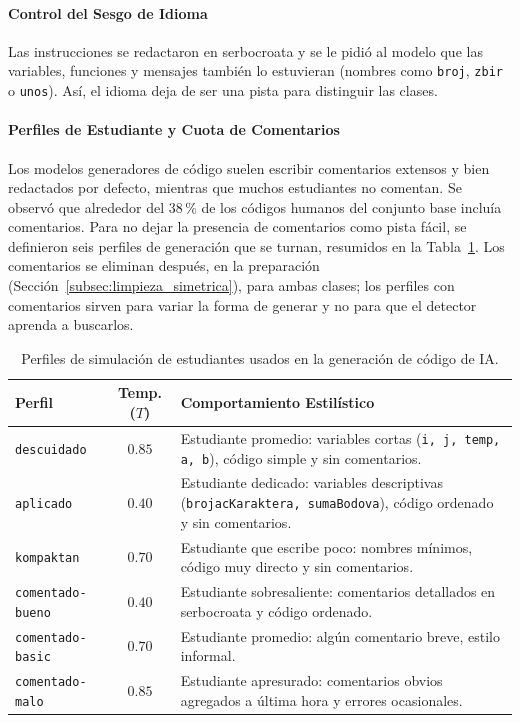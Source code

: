 \paragraph{Control del Sesgo de Idioma}
Las instrucciones se redactaron en serbocroata y se le pidió al modelo que las variables, funciones y mensajes también lo estuvieran (nombres como \texttt{broj}, \texttt{zbir} o \texttt{unos}). Así, el idioma deja de ser una pista para distinguir las clases.

\paragraph{Perfiles de Estudiante y Cuota de Comentarios}
Los modelos generadores de código suelen escribir comentarios extensos y bien redactados por defecto, mientras que muchos estudiantes no comentan. Se observó que alrededor del 38\,\% de los códigos humanos del conjunto base incluía comentarios. %
Para no dejar la presencia de comentarios como pista fácil, se definieron seis perfiles de generación que se turnan, resumidos en la Tabla~\ref{tab:perfiles_generacion}. Los comentarios se eliminan después, en la preparación (Sección~\ref{subsec:limpieza_simetrica}), para ambas clases; los perfiles con comentarios sirven para variar la forma de generar y no para que el detector aprenda a buscarlos.

\begin{table}[H]
    \centering
    \caption{Perfiles de simulación de estudiantes usados en la generación de código de IA.}
    \label{tab:perfiles_generacion}
    \begin{tabularx}{\textwidth}{|l|c|X|}
        \hline
        \textbf{Perfil} & \textbf{Temp. ($T$)} & \textbf{Comportamiento Estilístico} \\ \hline
        \texttt{descuidado} & $0.85$ & Estudiante promedio: variables cortas (\texttt{i, j, temp, a, b}), código simple y sin comentarios. \\ \hline
        \texttt{aplicado} & $0.40$ & Estudiante dedicado: variables descriptivas (\texttt{brojacKaraktera, sumaBodova}), código ordenado y sin comentarios. \\ \hline
        \texttt{kompaktan} & $0.70$ & Estudiante que escribe poco: nombres mínimos, código muy directo y sin comentarios. \\ \hline
        \texttt{comentado-bueno} & $0.40$ & Estudiante sobresaliente: comentarios detallados en serbocroata y código ordenado. \\ \hline
        \texttt{comentado-basic} & $0.70$ & Estudiante promedio: algún comentario breve, estilo informal. \\ \hline
        \texttt{comentado-malo} & $0.85$ & Estudiante apresurado: comentarios obvios agregados a última hora y errores ocasionales. \\ \hline
    \end{tabularx}
\end{table}

